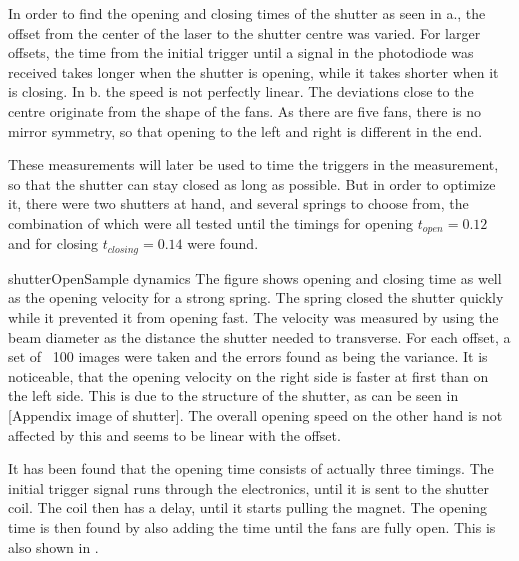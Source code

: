 
In order to find the opening and closing times of the shutter as seen in a., the offset from the center of the laser to the shutter centre was varied. For larger offsets, the time from the initial trigger until a signal in the photodiode was received takes longer when the shutter is opening, while it takes shorter when it is closing.
In b. the speed is not perfectly linear. The deviations close to the centre originate from the shape of the fans. As there are five fans, there is no mirror symmetry, so that opening to the left and right is different in the end.

These measurements will later be used to time the triggers in the measurement, so that the shutter can stay closed as long as possible. But in order to optimize it, there were two shutters at hand, and several springs to choose from, the combination of which were all tested until the timings for opening $t_{open}=0.12$ and for closing $t_{closing}=0.14$ were found.

\pltCustom{
	\begin{center}
		
		
	\end{center}
}
{shutterOpen}{Sample dynamics}{
	The figure shows opening and closing time as well as the opening velocity for a strong spring. The spring closed the shutter quickly while it prevented it from opening fast.
	The velocity was measured by using the beam diameter as the distance the shutter needed to transverse. For each offset, a set of ~100 images were taken and the errors found as being the variance. It is noticeable, that the opening velocity on the right side is faster at first than on the left side. This is due to the structure of the shutter, as can be seen in [Appendix image of shutter].
	The overall opening speed on the other hand is not affected by this and seems to be linear with the offset.
}

It has been found that the opening time consists of actually three timings. The initial trigger signal runs through the electronics, until it is sent to the shutter coil. The coil then has a delay, until it starts pulling the magnet. The opening time is then found by also adding the time until the fans are fully open. This is also shown in .

